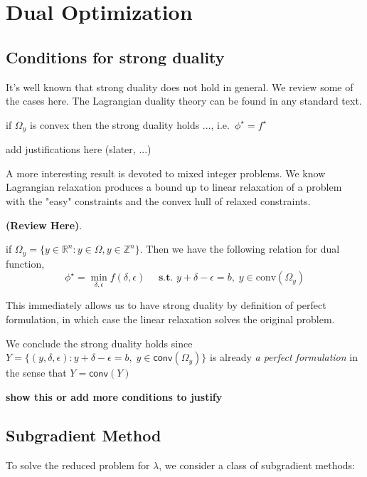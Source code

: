\documentclass[../main]{subfiles}
\begin{document}
\section{Dual Optimization}\label{sec:dual}


\subsection{Conditions for strong
  duality}\label{sec:dual.conditions-for-strong-duality}

It's well known that strong duality does not hold in general. We review
some of the cases here. The Lagrangian duality theory can be found in
any standard text.

\begin{theorem}
  if \(\Omega_y\) is convex then the strong duality holds ...,
  i.e.~\(\phi^\star = f^\star\)
\end{theorem}

add justifications here (slater, ...)

A more interesting result is devoted to mixed integer problems.
We know Lagrangian relaxation produces a bound up to
linear relaxation of a problem with the "easy" constraints
and the convex hull of relaxed constraints.

\textbf{(Review Here)}.

\begin{lemma}
  if \(\Omega_y = \{y \in \mathbb R^n: y \in \Omega, y\in \mathbb Z^n\}\).
  Then we have the following relation for dual function,
  \[ \phi^\star = \min_{\delta, \epsilon} f(\delta, \epsilon)\quad \textbf{ s.t. }  y + \delta - \epsilon = b,\; y \in \textrm{conv}(\Omega_y)\]
\end{lemma}

This immediately allows us to have strong duality by definition of perfect formulation,
in which case the linear relaxation solves the original problem.

\begin{corollary}\label{strong-ip}
  We conclude the strong duality holds since
  \(Y = \{(y, \delta, \epsilon): y + \delta - \epsilon = b,\; y \in \textsf{conv}(\Omega_y)\}\)
  is already \emph{a perfect formulation} in the sense that
  \(Y = \textsf{conv}(Y)\)
\end{corollary}

\textbf{show this or add more conditions to
  justify}



\subsection{Subgradient Method}\label{sec:dual.subgradient}
To solve the reduced problem for $\lambda$, we consider a class of subgradient
methods:
\end{document}
